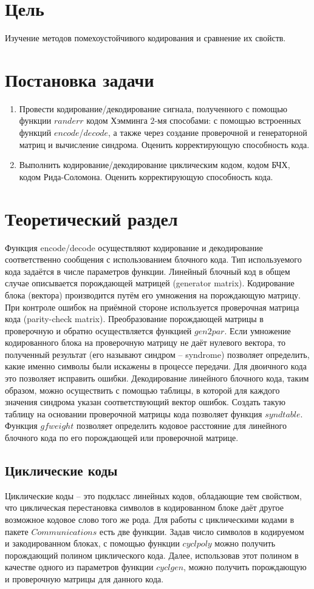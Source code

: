 \documentclass[a4paper]{article}
\begin{document}
\tableofcontents
\newpage
\section{Цель}
Изучение методов помехоустойчивого кодирования и сравнение их свойств.
\section{Постановка задачи}
\begin{enumerate}
    \item Провести кодирование/декодирование сигнала, полученного с помощью функции $randerr$ кодом Хэмминга $2$-мя способами: с помощью встроенных функций $encode$/$decode$, а также через создание проверочной и генераторной матриц и вычисление синдрома. Оценить корректирующую способность кода.
    \item Выполнить кодирование/декодирование циклическим кодом, кодом БЧХ, кодом Рида-Соломона. Оценить корректирующую способность кода.
\end{enumerate}
\section{Теоретический раздел}
Функция encode/decode осуществляют кодирование и декодирование соответственно сообщения с использованием блочного кода. Тип используемого кода задаётся в числе параметров функции. Линейный блочный код в общем случае описывается порождающей матрицей (generator matrix). Кодирование блока (вектора) производится путём его умножения на порождающую матрицу. При контроле ошибок на приёмной стороне используется проверочная матрица кода (parity-check matrix). Преобразование порождающей матрицы в проверочную и обратно осуществляется функцией $gen2par$. Если умножение кодированного блока на проверочную матрицу не даёт нулевого вектора, то полученный результат (его называют синдром -- syndrome) позволяет определить, какие именно символы были искажены в процессе передачи. Для двоичного кода это позволяет исправить ошибки. Декодирование линейного блочного кода, таким образом, можно осуществить с помощью таблицы, в которой для каждого значения синдрома указан соответствующий вектор ошибок. Создать такую таблицу на основании проверочной матрицы кода позволяет функция $syndtable$. Функция $gfweight$ позволяет определить кодовое расстояние для линейного блочного кода по его порождающей или проверочной матрице.\\
\subsection{Циклические коды}
Циклические коды -- это подкласс линейных кодов, обладающие тем свойством, что циклическая перестановка символов в кодированном блоке даёт другое возможное кодовое слово того же рода. Для работы с циклическими кодами в пакете $Communications$ есть две функции. Задав число символов в кодируемом и закодированном блоках, с помощью функции $cyclpoly$ можно получить порождающий полином циклического кода. Далее, использовав этот полином в качестве одного из параметров функции $cyclgen$, можно получить порождающую и проверочную матрицы для данного кода. 
\end{document}
